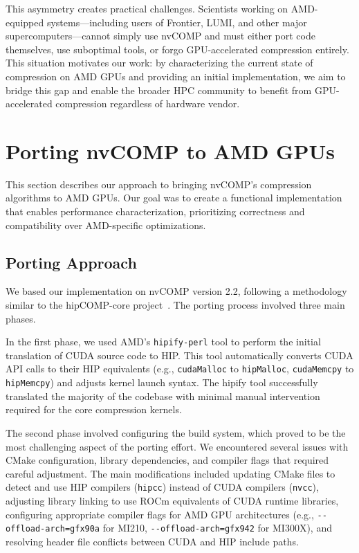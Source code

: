 \documentclass[runningheads]{llncs}
\begin{document}
This asymmetry creates practical challenges. Scientists working on AMD-equipped systems---including users of Frontier, LUMI, and other major supercomputers---cannot simply use nvCOMP and must either port code themselves, use suboptimal tools, or forgo GPU-accelerated compression entirely. This situation motivates our work: by characterizing the current state of compression on AMD GPUs and providing an initial implementation, we aim to bridge this gap and enable the broader HPC community to benefit from GPU-accelerated compression regardless of hardware vendor.


\section{Porting nvCOMP to AMD GPUs}
\label{sec:implementation}

This section describes our approach to bringing nvCOMP's compression algorithms to AMD GPUs. Our goal was to create a functional implementation that enables performance characterization, prioritizing correctness and compatibility over AMD-specific optimizations.

\subsection{Porting Approach}

We based our implementation on nvCOMP version 2.2, following a methodology similar to the hipCOMP-core project~\cite{hipcomp-core}. The porting process involved three main phases.

In the first phase, we used AMD's \texttt{hipify-perl} tool to perform the initial translation of CUDA source code to HIP. This tool automatically converts CUDA API calls to their HIP equivalents (e.g., \texttt{cudaMalloc} to \texttt{hipMalloc}, \texttt{cudaMemcpy} to \texttt{hipMemcpy}) and adjusts kernel launch syntax. The hipify tool successfully translated the majority of the codebase with minimal manual intervention required for the core compression kernels.

The second phase involved configuring the build system, which proved to be the most challenging aspect of the porting effort. We encountered several issues with CMake configuration, library dependencies, and compiler flags that required careful adjustment. The main modifications included updating CMake files to detect and use HIP compilers (\texttt{hipcc}) instead of CUDA compilers (\texttt{nvcc}), adjusting library linking to use ROCm equivalents of CUDA runtime libraries, configuring appropriate compiler flags for AMD GPU architectures (e.g., \texttt{-{}-offload-arch=gfx90a} for MI210, \texttt{-{}-offload-arch=gfx942} for MI300X), and resolving header file conflicts between CUDA and HIP include paths.
\end{document}
